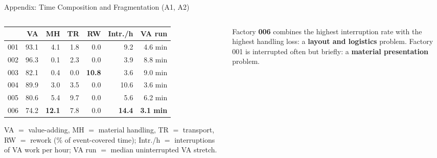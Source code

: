 \documentclass[aspectratio=169]{beamer}
\newcommand{\keyc}[1]{\textbf{\textcolor{egoblue}{#1}}}
\newcommand{\keya}[1]{\textbf{\textcolor{egoamber!85!black}{#1}}}
\begin{document}
\begin{frame}{Appendix: Time Composition and Fragmentation (A1, A2)}
  \begin{columns}[T]
  \begin{column}{0.52\textwidth}
    \begin{center}
    \footnotesize
    \begin{tabular}{lrrrrrr}
      \toprule
      & VA & MH & TR & RW & Intr./h & VA run \\
      \midrule
      001 & 93.1 & 4.1 & 1.8 & 0.0 & 9.2 & 4.6 min \\
      002 & 96.3 & 0.1 & 2.3 & 0.0 & 3.9 & 8.8 min \\
      003 & 82.1 & 0.4 & 0.0 & \keya{10.8} & 3.6 & 9.0 min \\
      004 & 89.9 & 3.0 & 3.5 & 0.0 & 10.6 & 3.6 min \\
      005 & 80.6 & 5.4 & 9.7 & 0.0 & 5.6 & 6.2 min \\
      006 & 74.2 & \keya{12.1} & 7.8 & 0.0 & \keya{14.4} & \keya{3.1 min} \\
      \bottomrule
    \end{tabular}
    \end{center}
    \vspace{2mm}
    \small VA $=$ value-adding, MH $=$ material handling, TR $=$ transport,
    RW $=$ rework (\% of event-covered time); Intr./h $=$ interruptions of VA
    work per hour; VA run $=$ median uninterrupted VA stretch.
  \end{column}
  \begin{column}{0.44\textwidth}
    \begin{center}
    \end{center}
    \small Factory \keya{006} combines the highest interruption rate with the
    highest handling loss: a \keyc{layout and logistics} problem. Factory 001
    is interrupted often but briefly: a \keyc{material presentation} problem.
  \end{column}
  \end{columns}
\end{frame}
\end{document}
